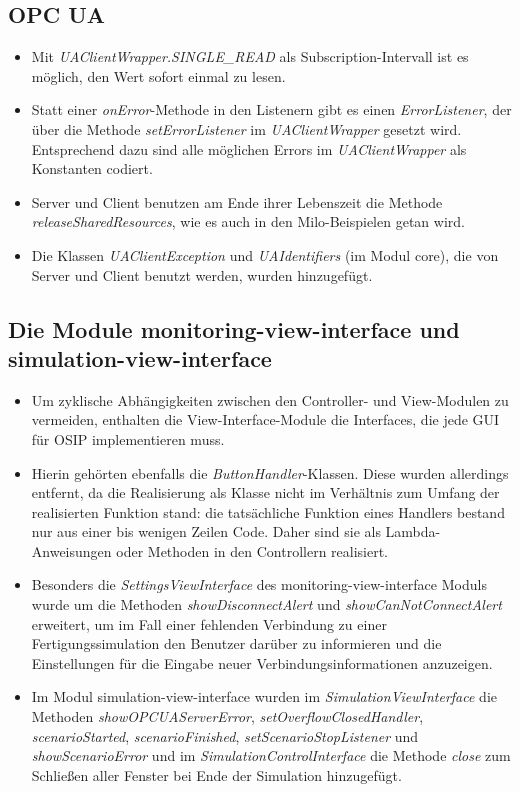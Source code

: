 \documentclass[parskip=full]{scrartcl}
\begin{document}
\subsection{OPC UA}
\begin{itemize}
 \item Mit \emph{UAClientWrapper.SINGLE\_READ} als Subscription-Intervall ist es möglich, den Wert sofort einmal zu lesen.
 \item Statt einer \emph{onError}-Methode in den Listenern gibt es einen \emph{ErrorListener}, der über die Methode \emph{setErrorListener} im \emph{UAClientWrapper} gesetzt wird. Entsprechend dazu sind alle möglichen Errors im \emph{UAClientWrapper} als Konstanten codiert.
 \item Server und Client benutzen am Ende ihrer Lebenszeit die Methode \emph{releaseSharedResources}, wie es auch in den Milo-Beispielen getan wird.
 \item Die Klassen \emph{UAClientException} und \emph{UAIdentifiers} (im Modul core), die von Server und Client benutzt werden, wurden hinzugefügt.
\end{itemize}

\subsection{Die Module monitoring-view-interface und simulation-view-interface}
\begin{itemize}
 \item Um zyklische Abhängigkeiten zwischen den Controller- und View-Modulen zu vermeiden, enthalten die View-Interface-Module die Interfaces, die jede GUI für OSIP implementieren muss.
 \item Hierin gehörten ebenfalls die \emph{ButtonHandler}-Klassen. Diese wurden allerdings entfernt, da die Realisierung als Klasse nicht im Verhältnis zum Umfang der realisierten Funktion stand: die tatsächliche Funktion eines Handlers bestand nur aus einer bis wenigen Zeilen Code. Daher sind sie als Lambda-Anweisungen oder Methoden in den Controllern realisiert.
 \item Besonders die \emph{SettingsViewInterface} des monitoring-view-interface Moduls wurde um die Methoden \emph{showDisconnectAlert} und \emph{showCanNotConnectAlert} erweitert, um im Fall einer fehlenden Verbindung zu einer Fertigungssimulation den Benutzer darüber zu informieren und die Einstellungen für die Eingabe neuer Verbindungsinformationen anzuzeigen.
 \item Im Modul simulation-view-interface wurden im \emph{SimulationViewInterface} die Methoden \emph{showOPCUAServerError}, \emph{setOverflowClosedHandler}, \emph{scenarioStarted}, \emph{scenarioFinished}, \emph{setScenarioStopListener} und \emph{showScenarioError} und im \emph{SimulationControlInterface} die Methode \emph{close} zum Schließen aller Fenster bei Ende der Simulation hinzugefügt.
\end{itemize}
\end{document}
